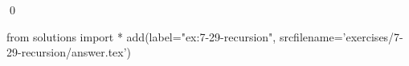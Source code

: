 
\begin{ex}
  \label{ex:7-29-recursion}
  
  \qed
\end{ex}
\begin{python0}
from solutions import *
add(label="ex:7-29-recursion",
    srcfilename='exercises/7-29-recursion/answer.tex')
\end{python0}
